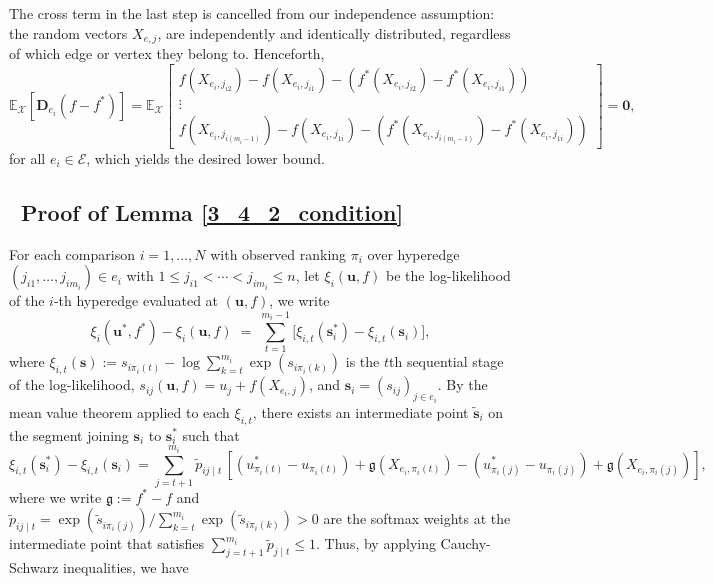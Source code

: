 \documentclass[
  12pt]{article}
\begin{document}
\noindent The cross term in the last step is cancelled from our independence assumption: the random vectors $X_{e, j}$, are independently and identically distributed, regardless of which edge or vertex they belong to. Henceforth,  
{\small$$
\mathbb{E}_{\mathcal{X}}[\boldsymbol{D}_{e_i}\left(f-f^*\right)] =\mathbb{E}_{\mathcal{X}}\left[\begin{array}{c}
f(X_{e_i, j_{i2}})-f(X_{e_{i}, j_{i1}}) - (f^*(X_{e_i, j_{i2}})-f^*(X_{e_{i}, j_{i1}})) \\
\vdots \\
f(X_{e_i, j_{i(m_i-1)}})-f(X_{e_i, j_{1i}}) - (f^*(X_{e_i, j_{i(m_i-1)}})-f^*(X_{e_i, j_{1i}}))
\end{array}\right]= \boldsymbol{0},$$}
for all $e_i \in \mathcal{E}$, which yields the desired lower bound. 

\subsection{~Proof of Lemma \ref{3_4_2_condition}}
For each comparison $i=1,\ldots,N$ with observed ranking $\pi_i$ over
hyperedge $(j_{i1},\ldots,j_{im_i})\in e_i$ with
$1\leq j_{i1}<\cdots<j_{im_i}\leq n$, let $\xi_i(\boldsymbol{u},f)$ be the log-likelihood of the $i$-th hyperedge evaluated at $(\boldsymbol{u},f)$, we write
$$\xi_i(\boldsymbol{u}^*,f^*)-\xi_i(\boldsymbol{u},f)
\;=\;\sum_{t=1}^{m_i-1}
  \bigl[\xi_{i,t}(\boldsymbol{s}_i^*)-\xi_{i,t}(\boldsymbol{s}_i)\bigr],$$
where
$\xi_{i,t}(\boldsymbol{s})
  :=s_{i\pi_i(t)}-\log\sum_{k=t}^{m_i}\exp(s_{i\pi_i(k)})$
is the $t$th sequential stage of the log-likelihood,
$s_{ij}(\boldsymbol{u},f)=u_j+f(X_{e_i,j})$, and
$\boldsymbol{s}_i=(s_{ij})_{j\in e_i}$.
By the mean value theorem applied to each $\xi_{i,t}$, there exists an intermediate point
$\widetilde{\boldsymbol{s}}_{i}$ on the segment joining
$\boldsymbol{s}_i$ to $\boldsymbol{s}_i^*$ such that
{\small\begin{equation*}
\xi_{i,t}(\boldsymbol{s}_i^*)-\xi_{i,t}(\boldsymbol{s}_i)=\sum_{j=t+1}^{m_i}\widetilde{p}_{ij\mid t}\,\left[(u_{\pi_i(t)}^*-u_{\pi_i(t)})+\mathfrak{g}(X_{e_i,\pi_i(t)})-(u_{\pi_i(j)}^*-u_{\pi_i(j)})+\mathfrak{g}(X_{e_i,{\pi_i(j)}})\right],
\end{equation*}}
\noindent where we write $\mathfrak{g}:=f^*-f$ and $\widetilde{p}_{ij\mid t}=\exp(\widetilde{s}_{i\pi_i(j)})/\sum_{k=t}^{m_i}\exp(\widetilde{s}_{i\pi_i(k)})> 0$ are the softmax weights at the intermediate point that satisfies $\sum_{j=t+1}^{m_i}\widetilde{p}_{j\mid t}\leq 1$. Thus, by applying Cauchy-Schwarz inequalities, we have
\end{document}
